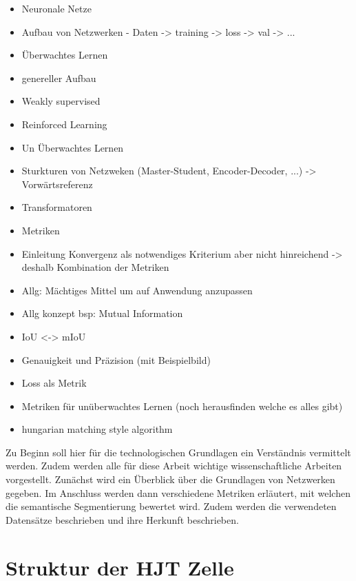 \begin{itemize}
    \item Neuronale Netze
        \item Aufbau von Netzwerken - Daten -> training -> loss -> val -> ...
        \item Überwachtes Lernen
            \item  genereller Aufbau
        \item Weakly supervised
        \item Reinforced Learning
        \item Un Überwachtes Lernen
            \item Sturkturen von Netzweken (Master-Student, Encoder-Decoder, ...) -> Vorwärtsreferenz
            \item Transformatoren
        \item Metriken 
            \item Einleitung Konvergenz als notwendiges Kriterium aber nicht hinreichend -> deshalb Kombination der Metriken  
            \item Allg: Mächtiges Mittel um auf Anwendung anzupassen 
                \item Allg konzept bsp: Mutual Information
            \item IoU <->  mIoU
            \item Genauigkeit und Präzision (mit Beispielbild) 
            \item Loss als Metrik 
            \item Metriken für unüberwachtes Lernen (noch herausfinden welche es alles gibt)
            \item hungarian matching style algorithm
\end{itemize}
\fi

Zu Beginn soll hier für die technologischen Grundlagen ein Verständnis vermittelt werden. Zudem werden alle für diese Arbeit wichtige wissenschaftliche Arbeiten vorgestellt. Zunächst wird ein Überblick über die Grundlagen von Netzwerken gegeben. Im Anschluss werden dann verschiedene Metriken erläutert, mit welchen die semantische Segmentierung bewertet wird. Zudem werden die verwendeten Datensätze beschrieben und ihre Herkunft beschrieben.

\section{Struktur der HJT Zelle}

